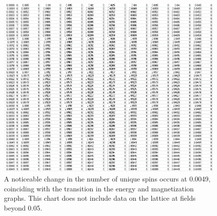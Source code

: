 \documentclass{article}
\begin{document}
 \begin{figure}[ht]
 \centering
 \includegraphics[keepaspectratio,scale=0.7]{111_3000/000to005SpinChart.png}  
 \caption{A noticeable change in the number of unique spins occurs at 0.0049, coinciding with the transition
 in the energy and magnetization graphs. This chart does not include data on the lattice at fields beyond 0.05.}
 \end{figure}
\clearpage
\end{document}
